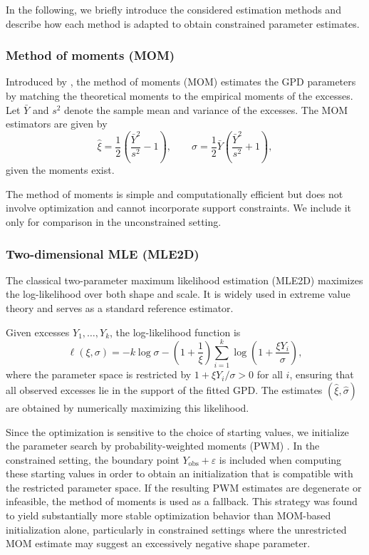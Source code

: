 In the following, we briefly introduce the considered estimation methods and describe how each method is adapted to obtain constrained parameter estimates.

\subsubsection*{Method of moments (MOM)}

Introduced by \citet{hosking1987parameter}, the method of moments (MOM) estimates the GPD parameters by matching the theoretical moments to the empirical moments of the excesses. 
Let $\bar{Y}$ and $s^2$ denote the sample mean and variance of the excesses. 
The MOM estimators are given by
\begin{equation}
\hat{\xi} = \frac{1}{2} \left( \frac{\bar{Y}^2}{s^2} - 1 \right), 
\qquad
\hat{\sigma} = \frac{1}{2} \bar{Y} \left( \frac{\bar{Y}^2}{s^2} + 1 \right),
\end{equation}
given the moments exist.

The method of moments is simple and computationally efficient but does not involve optimization and cannot incorporate support constraints. We include it only for comparison in the unconstrained setting.

\subsubsection*{Two-dimensional MLE (MLE2D)}

The classical two-parameter maximum likelihood estimation (MLE2D) \citep{pickands1975statistical} maximizes the log-likelihood over both shape and scale. It is widely used in extreme value theory and serves as a standard reference estimator.

Given excesses $Y_1, \dots, Y_k$, the log-likelihood function is
\begin{equation}
\ell(\xi, \sigma) = -k \log \sigma - \left(1 + \frac{1}{\xi}\right) \sum_{i=1}^k \log\left(1 + \frac{\xi Y_i}{\sigma}\right),
\end{equation}
where the parameter space is restricted by $1+\xi Y_i/\sigma>0$ for all $i$, ensuring that all observed excesses lie in the support of the fitted GPD. The estimates $(\hat{\xi}, \hat{\sigma})$ are obtained by numerically maximizing this likelihood.

Since the optimization is sensitive to the choice of starting values, we initialize the parameter search by probability-weighted moments (PWM) \citep{greenwood1979probability}. In the constrained setting, the boundary point $Y_{\mathrm{obs}}+\varepsilon$ is included when computing these starting values in order to obtain an initialization that is compatible with the restricted parameter space. If the resulting PWM estimates are degenerate or infeasible, the method of moments is used as a fallback. This strategy was found to yield substantially more stable optimization behavior than MOM-based initialization alone, particularly in constrained settings where the unrestricted MOM estimate may suggest an excessively negative shape parameter.

